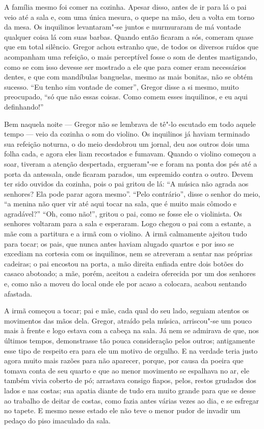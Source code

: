 A família mesmo foi comer na cozinha. Apesar disso, antes de ir para lá o
pai veio até a sala e, com uma única mesura, o quepe na mão, deu a volta
em torno da mesa. Os inquilinos levantaram"-se juntos e murmuraram de má
vontade qualquer coisa lá com suas barbas. Quando então ficaram a sós,
comeram quase que em total silêncio. Gregor achou estranho que, de todos
os diversos ruídos que acompanham uma refeição, o mais perceptível fosse o
som de dentes mastigando, como se com isso devesse ser mostrado a ele que
para comer eram necessários dentes, e que com mandíbulas banguelas, mesmo
as mais bonitas, não se obtém sucesso. “Eu tenho sim vontade de comer”,
Gregor disse a si mesmo, muito preocupado, “só que não essas
coisas. Como comem esses inquilinos, e eu aqui definhando!”

Bem naquela noite --- Gregor não se lembrava de tê"-lo escutado em todo
aquele tempo --- veio da cozinha o som do violino. Os inquilinos já haviam
terminado sua refeição noturna, o do meio desdobrou um jornal, deu aos
outros dois uma folha cada, e agora eles liam recostados e fumavam. Quando
o violino começou a soar, tiveram a atenção despertada, ergueram"-se e
foram na ponta dos pés até a porta da antessala, onde ficaram parados, um
espremido contra o outro. Devem ter sido ouvidos da cozinha, pois o pai
gritou de lá: “A música não agrada aos senhores? Ela pode parar agora
mesmo”. “Pelo contrário”, disse o senhor do meio, “a menina não quer vir
até aqui tocar na sala, que é muito mais cômodo e agradável?” “Oh, como
não!”, gritou o pai, como se fosse ele o violinista. Os senhores voltaram
para a sala e esperaram. Logo chegou o pai com a estante, a mãe com a
partitura e a irmã com o violino. A irmã calmamente ajeitou tudo para
tocar; os pais, que nunca antes haviam alugado quartos e por isso se
excediam na cortesia com os inquilinos, nem se atreveram a sentar nas
próprias cadeiras; o pai encostou na porta, a mão direita enfiada entre
dois botões do casaco abotoado; a mãe, porém, aceitou a cadeira oferecida
por um dos senhores e, como não a moveu do local onde ele por acaso a
colocara, acabou sentando afastada.

A irmã começou a tocar; pai e mãe, cada qual do seu lado, seguiam atentos
os movimentos das mãos dela. Gregor, atraído pela música, arriscou"-se um
pouco mais à frente e logo estava com a cabeça na sala. Já nem se admirava
de que, nos últimos tempos, demonstrasse tão pouca consideração pelos
outros; antigamente esse tipo de respeito era para ele um motivo de
orgulho. E na verdade teria justo agora muito mais razões para não
aparecer, porque, por causa da poeira que tomava conta de seu quarto e que
ao menor movimento se espalhava no ar, ele também vivia coberto de pó;
arrastava consigo fiapos, pelos, restos grudados dos lados e nas costas;
sua apatia diante de tudo era muito grande para que se desse ao trabalho
de deitar de costas, como fazia antes várias vezes ao dia, e se esfregar
no tapete. E mesmo nesse estado ele não teve o menor pudor de invadir um
pedaço do piso imaculado da sala.

